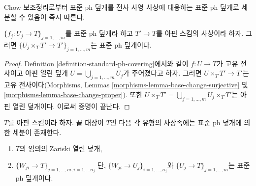 \noindent
Chow 보조정리로부터 표준 ph 덮개를 전사 사영 사상에 대응하는 표준 ph
덮개로 세분할 수 있음이 즉시 따른다.

\begin{lemma}
\label{lemma-base-change-standard-ph}
$\{f_j : U_j \to T\}_{j = 1, \ldots, m}$를 표준 ph 덮개라 하고
$T' \to T$를 아핀 스킴의 사상이라 하자. 그러면
$\{U_j \times_T T' \to T'\}_{j = 1, \ldots, m}$는 표준 ph 덮개이다.
\end{lemma}

\begin{proof}
Definition \ref{definition-standard-ph-covering}에서와 같이
$f : U \to T$가 고유 전사이고 아핀 열린 덮개
$U = \bigcup_{j = 1, \ldots, m} U_j$가 주어졌다고 하자. 그러면
$U \times_T T' \to T'$는 고유 전사이다(Morphisms, Lemmas
\ref{morphisms-lemma-base-change-surjective} 및
\ref{morphisms-lemma-base-change-proper}). 또한
$U \times_T T' = \bigcup_{j = 1, \ldots, m} U_j \times_T T'$는 아핀 열린
덮개이다. 이로써 증명이 끝난다.
\end{proof}

\begin{lemma}
\label{lemma-refine-by-standard-ph}
$T$를 아핀 스킴이라 하자. 끝 대상이 $T$인 다음 각 유형의 사상족에는
표준 ph 덮개에 의한 세분이 존재한다.
\begin{enumerate}
\item $T$의 임의의 Zariski 열린 덮개,
\item $\{W_{ji} \to T\}_{j = 1, \ldots, m, i = 1, \ldots n_j}$
단, $\{W_{ji} \to U_j\}_{i = 1, \ldots, n_j}$와
$\{U_j \to T\}_{j = 1, \ldots, m}$는 표준 ph 덮개이다.
\end{enumerate}
\end{lemma}

